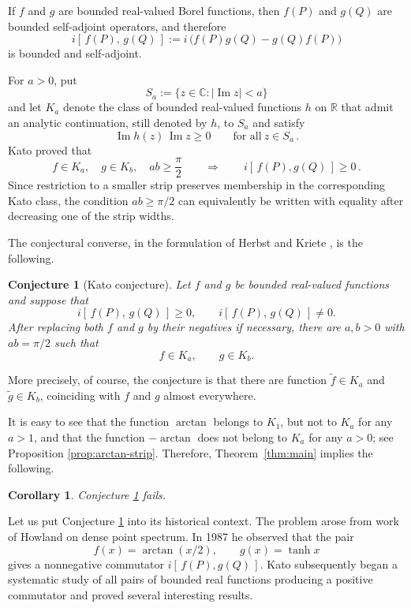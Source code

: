 \documentclass[11pt]{article}
\newtheorem{corollary}[theorem]{Corollary}
\newtheorem{conjecture}[theorem]{Conjecture}
\theoremstyle{definition}
\theoremstyle{remark}
\newcommand{\R}{\mathbb{R}}
\newcommand{\C}{\mathbb{C}}
\newcommand{\abs}[1]{\left\lvert #1\right\rvert}
\begin{document}
If $f$ and $g$ are bounded real-valued Borel functions, then $f(P)$ and $g(Q)$ are bounded self-adjoint operators, and therefore
\[
i[\,f(P),\, g(Q)\,]:=i\,\bigl(f(P)g(Q)-g(Q)f(P)\bigr)
\]
is bounded and self-adjoint. 

For $a>0$, put
\[
S_a:=\{z\in\C:\abs{\operatorname{Im}z}<a\}
\]
and let $K_a$ denote the class of bounded real-valued functions $h$ on $\R$ that admit an analytic continuation, still denoted by $h$, to $S_a$ and satisfy
\begin{equation}\label{eq:Kato-sign}
\operatorname{Im}h(z)\,\operatorname{Im}z\geq 0
\qquad \text{for all}\ z\in S_a \,.
\end{equation}
Kato \cite{Kato} proved that
\begin{equation}\label{eq:Kato-sufficient}
f\in K_a,\quad g\in K_b,\quad ab\geq \frac{\pi}{2}
\qquad\Longrightarrow\qquad
i[\,f(P),g(Q)\,]\geq 0 \,.
\end{equation}
Since restriction to a smaller strip preserves membership in the corresponding Kato class, the condition $ab\geq\pi/2$ can equivalently be written with equality after decreasing one of the strip widths.

The conjectural converse, in the formulation of Herbst and Kriete \cite{HerbstKriete}, is the following.

\begin{conjecture}[Kato conjecture]\label{conj:Kato}
Let $f$ and $g$ be bounded real-valued functions and suppose that
\[
i[\,f(P),\,g(Q)\,]\geq 0,
\qquad
i[\,f(P),\, g(Q)\,]\neq 0.
\]
After replacing both $f$ and $g$ by their negatives if necessary, there are $a,b>0$ with $ab=\pi/2$ such that
\[
f\in K_a,
\qquad
g\in K_b.
\]
\end{conjecture}

More precisely, of course, the conjecture is that there are function $\tilde f\in K_a$ and $\tilde g\in K_b$, coinciding with $f$ and $g$ almost everywhere.

It is easy to see that the function $\arctan$ belongs to $K_1$, but not to $K_a$ for any $a>1$, and that the function $-\arctan$ does not belong to $K_a$ for any $a>0$; see Proposition \ref{prop:arctan-strip}. Therefore, Theorem~\ref{thm:main} implies the following.

\begin{corollary}
Conjecture \ref{conj:Kato} fails.
\end{corollary}

Let us put Conjecture \ref{conj:Kato} into its historical context. The problem arose from work of Howland \cite{Howland} on dense point spectrum.  In 1987 he observed that the pair
\[
f(x)=\arctan(x/2),
\qquad
g(x)=\tanh x
\]
gives a nonnegative commutator $i[\,f(P),g(Q)\,]$.  Kato subsequently began a systematic study of all pairs of bounded real functions producing a positive commutator \cite{Kato} and proved several interesting results.
\end{document}
